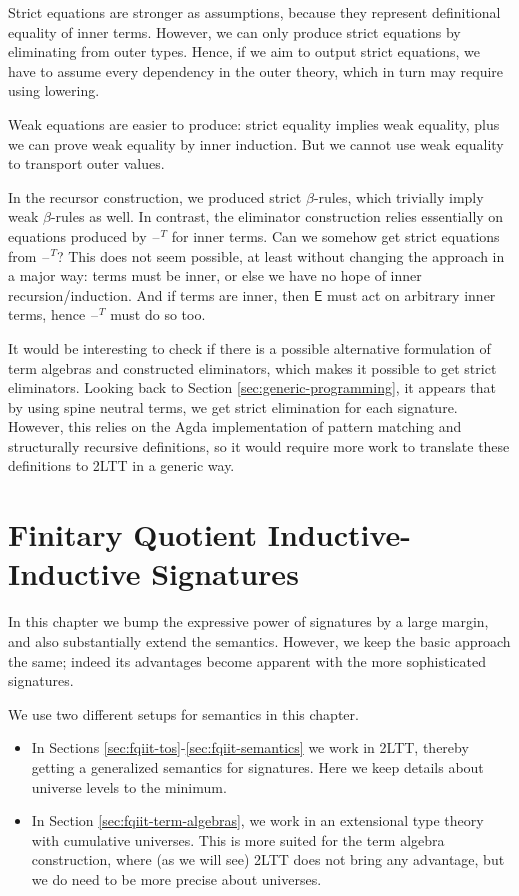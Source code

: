 \documentclass[12pt,a4paper,twoside,openany]{book}
\theoremstyle{remark}
\theoremstyle{definition}
\theoremstyle{theorem}
\newcommand{\ms}[1]{\mathsf{#1}}
\newcommand{\blank}{\mathord{\hspace{1pt}\text{--}\hspace{1pt}}}
\begin{document}
Strict equations are stronger as assumptions, because they represent
definitional equality of inner terms. However, we can only produce strict
equations by eliminating from outer types. Hence, if we aim to output strict
equations, we have to assume every dependency in the outer theory, which in turn
may require using lowering.

Weak equations are easier to produce: strict equality implies weak equality,
plus we can prove weak equality by inner induction. But we cannot use weak
equality to transport outer values.

In the recursor construction, we produced strict $\beta$-rules, which trivially
imply weak $\beta$-rules as well. In contrast, the eliminator construction
relies essentially on equations produced by $\blank^T$ for inner terms. Can we
somehow get strict equations from $\blank^T$? This does not seem possible, at
least without changing the approach in a major way: terms must be inner, or else
we have no hope of inner recursion/induction. And if terms are inner, then
$\ms{E}$ must act on arbitrary inner terms, hence $\blank^T$ must do so too.

It would be interesting to check if there is a possible alternative formulation of
term algebras and constructed eliminators, which makes it possible to get strict
eliminators. Looking back to Section \ref{sec:generic-programming}, it appears
that by using spine neutral terms, we get strict elimination for each
signature. However, this relies on the Agda implementation of pattern matching
and structurally recursive definitions, so it would require more work to translate
these definitions to 2LTT in a generic way.

\chapter[Finitary QII Signatures]{Finitary Quotient Inductive-Inductive Signatures}
\label{chap:fqiit}

In this chapter we bump the expressive power of signatures by a large margin,
and also substantially extend the semantics. However, we keep the basic approach
the same; indeed its advantages become apparent with the more sophisticated
signatures.

We use two different setups for semantics in this chapter.
\begin{itemize}
  \item In Sections \ref{sec:fqiit-tos}-\ref{sec:fqiit-semantics} we work in 2LTT, thereby
        getting a generalized semantics for signatures. Here we keep details about universe
        levels to the minimum.
  \item In Section \ref{sec:fqiit-term-algebras}, we work in an
        extensional type theory with cumulative universes. This is more suited for the term
        algebra construction, where (as we will see) 2LTT does not bring any advantage, but
        we do need to be more precise about universes.
\end{itemize}
\end{document}
